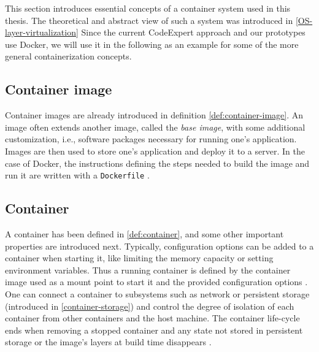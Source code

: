 This section introduces essential concepts of a container system used in this thesis. The theoretical and abstract view of such a system was introduced in \ref{OS-layer-virtualization}  Since the current CodeExpert approach and our prototypes use Docker, we will use it in the following as an example for some of the more general containerization concepts.

\subsection{Container image}\label{container-image}
Container images are already introduced in definition \ref{def:container-image}. %
An image often extends another image, called the \emph{base image}, with some additional customization, i.e., software packages necessary for running one's application. Images are then used to store one's application and deploy it to a server. In the case of Docker, the instructions defining the steps needed to build the image and run it are written with a \verb|Dockerfile| \cite{dockerOverview}.

\subsection{Container}\label{containers}
A container has been defined in \ref{def:container}, and some other important properties are introduced next. Typically, configuration options can be added to a container when starting it, like limiting the memory capacity or setting environment variables. Thus a running container is defined by the container image used as a mount point to start it and the provided configuration options \cite{redHatContainerTerms}. One can connect a container to subsystems such as network or persistent storage (introduced in \ref{container-storage}) and control the degree of isolation of each container from other containers and the host machine. The container life-cycle ends when removing a stopped container and any state not stored in persistent storage or the image's layers at build time disappears \cite{dockerOverview}. 


